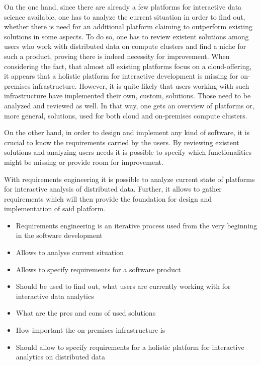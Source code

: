 \documentclass[a4paper,twoside]{article}
\begin{document}
On the one hand, since there are already a few platforms for interactive data science available, one has to analyze the current situation in order to find out, whether there is need for an additional platform claiming to outperform existing solutions in some aspects. To do so, one has to review existent solutions among users who work with distributed data on compute clusters and find a niche for such a product, proving there is indeed necessity for improvement. When considering the fact, that almost all existing platforms focus on a cloud-offering, it appears that a holistic platform for interactive development is missing for on-premises infrastructure. However, it is quite likely that users working with such infrastructure have implemented their own, custom, solutions. Those need to be analyzed and reviewed as well. In that way, one gets an overview of platforms or, more general, solutions, used for both cloud and on-premises compute clusters.

On the other hand, in order to design and implement any kind of software, it is crucial to know the requirements carried by the users. By reviewing existent solutions and analyzing users needs it is possible to specify which functionalities might be missing or provide room for improvement.

With requirements engineering it is possible to analyze current state of platforms for interactive analysis of distributed data. Further, it allows to gather requirements which will then provide the foundation for design and implementation of said platform.




\begin{itemize}


    \item Requirements engineering is an iterative process used from the very beginning in the software development
    \item Allows to analyse current situation
    \item Allows to specify requirements for a software product
    \item Should be used to find out, what users are currently working with for interactive data analytics
    \item What are the pros and cons of used solutions
    \item How important the on-premises infrastructure is
    \item Should allow to specify requirements for a holistic platform for interactive analytics on distributed data
\end{itemize}
\end{document}
